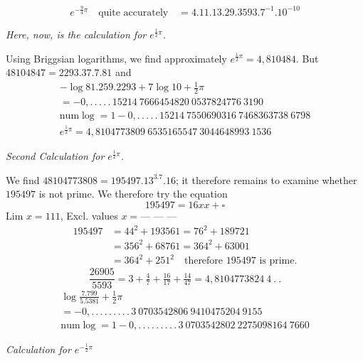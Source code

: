 \[
e^{-\frac94\pi}\quad\text{quite accurately}\quad=4.11.13.29.3593.7^{-1}.10^{-10}
\]

\begin{center}\emph{Here, now, is the calculation for $e^{\frac12\pi}$.}\end{center}

Using Briggsian logarithms, we find approximately $e^{\frac12\pi}=4{,}810484$.
But $48104847=2293.37.7.81$ and
\[
\begin{gathered}
-\log81.259.2293+7\log10+\tfrac12\pi\\[5pt]=-0{,}.\,.\,.\,.\,.\,15214\ 7666454820\ 0537824776\ 3190\\[5pt]
\mathrm{num}\log=1-0{,}.\,.\,.\,.\,.\,15214\ 7550690316\ 7468363738\ 6798\\[5pt]
e^{\frac12\pi}=4{,}8104773809\ 6535165547\ 3044648993\ 1536
\end{gathered}
\]

\par{}

\begin{center}\emph{Second Calculation for $e^{\frac12\pi}$.}\end{center}

We find $48104773808=195497.13^3.7.16$; it therefore remains to examine whether $195497$ is not prime.
We therefore try the equation
\[
195497=16xx+\square
\]
Lim $x=111$, Excl. values $x=\text{---\ ---\ ---}$
\[
\begin{aligned}
195497&=44^2+193561=76^2+189721\\[6pt]&=356^2+68761=364^2+63001\\[5pt]
&=364^2+251^2\quad\text{therefore }195497\text{ is prime.}
\end{aligned}
\]
\[
\frac{26905}{5593}=3+\tfrac47+\tfrac{16}{17}+\tfrac{14}{47}=4{,}8104773824\ 4\ .\ .
\]
\[
\begin{gathered}
\log\frac{7.799}{5.5381}+\tfrac12\pi\\[5pt]=-0{,}.\,.\,.\,.\,.\,.\,.\,.\,.\,3\ 0703542806\ 9410475204\ 9155\\[5pt]
\mathrm{num}\log=1-0{,}.\,.\,.\,.\,.\,.\,.\,.\,.\,3\ 0703542802\ 2275098164\ 7660
\end{gathered}
\]

\begin{center}\emph{Calculation for $e^{-\frac12\pi}$}\end{center}

